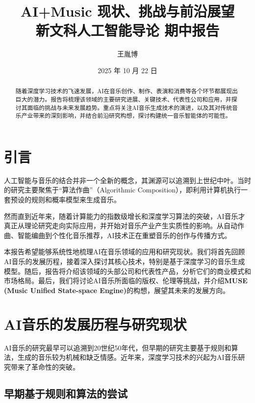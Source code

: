 \documentclass[12pt]{article}
\title{AI+Music 现状、挑战与前沿展望 \\ \large 新文科人工智能导论 期中报告}
\author{王胤博}
\date{2025 年 10 月 22 日}
\begin{document}
\maketitle

\begin{abstract}
\noindent
随着深度学习技术的飞速发展，AI在音乐创作、制作、表演和消费等各个环节都展现出巨大的潜力。报告将梳理该领域的主要研究进展、关键技术、代表性公司和应用，并探讨其面临的挑战与未来发展趋势。重点将关注AI音乐生成技术的演进，以及其对传统音乐产业带来的深刻影响，并结合前沿研究构想，探讨构建统一音乐智能体的可能性。
\end{abstract}


\tableofcontents

\newpage

\section{引言}

人工智能与音乐的结合并非一个全新的概念，其渊源可以追溯到上世纪中叶。当时的研究主要聚焦于“算法作曲”（Algorithmic Composition），即利用计算机执行一套预设的规则和概率模型来生成音乐。

然而直到近年来，随着计算能力的指数级增长和深度学习算法的突破，AI音乐才真正从理论研究走向实际应用，并开始对音乐产业产生实质性的影响。从自动作曲、智能编曲到个性化音乐推荐，AI技术正在重塑音乐的创作与传播方式。

本报告希望能够系统性地梳理AI在音乐领域的应用和研究现状。我们将首先回顾AI音乐的发展历程，接着深入探讨其核心技术，特别是基于深度学习的音乐生成模型。随后，报告将介绍该领域的头部公司和代表性产品，分析它们的商业模式和市场格局。最后，我们将讨论AI音乐所面临的版权、伦理等挑战，并介绍\textbf{MUSE (Music Unified State-space Engine)}的构想，展望其未来的发展方向。

\section{AI音乐的发展历程与研究现状}

AI音乐的研究最早可以追溯到20世纪50年代，但早期的研究主要基于规则和算法，生成的音乐较为机械和缺乏情感。近年来，深度学习技术的兴起为AI音乐研究带来了革命性的突破。

\subsection{早期基于规则和算法的尝试}
\end{document}
